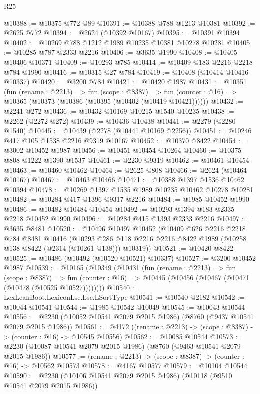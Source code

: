 \begin{lexlean}{R25}
\begin{coremodule}
@10388 := @10375 @772 @89
@10391 := @10388 @788 @1213 @10381
@10392 := @2625 @772
@10394 := @2624 (@10392 @10167)
@10395 := @10391 @10394
@10402 := @10269 @788 @1212 @1989 @10235 @10381 @10278 @10281
@10405 := @10285 @787 @2333 @2216
@10406 := @3635 @1990
@10408 := @10405 @10406 @10371
@10409 := @10293 @785
@10414 := @10409 @183 @2216 @2218 @784 @1990
@10416 := @10315 @27 @784
@10419 := @10408 (@10414 @10416 @10337)
@10420 := @3200 @784
@10421 := @10420 @1987
@10431 := @10351
    (fun (rename : @2213) =>
    fun (scope : @8387) =>
    fun (counter : @16) => @10365 (@10373 (@10386 (@10395 (@10402 (@10419 @10421))))))
@10432 := @2241 @272
@10436 := @10432 @10169 @10215 @1540 @10235
@10438 := @2262 (@2272 @272)
@10439 := @10436 @10438
@10441 := @2279 (@2280 @1540)
@10445 := @10439 (@2278 (@10441 @10169 @2256))
@10451 := @10246 @417 @105 @1538 @2216 @9319 @10167
@10452 := @10370 @8422
@10454 := @3002 @10452 @1987
@10456 := @10451 @10454 @10264
@10460 := @10375 @808 @1222 @1390 @1537
@10461 := @2230 @9319
@10462 := @10461 @10454
@10463 := @10460 @10462
@10464 := @2625 @808
@10466 := @2624 (@10464 @10167)
@10467 := @10463 @10466
@10471 := @10388 @1397 @1536 @10462 @10394
@10478 := @10269 @1397 @1535 @1989 @10235 @10462 @10278 @10281
@10482 := @10284 @417 @1396 @9317 @2216
@10484 := @1985 @10452 @1990
@10486 := @10482 @10484 @10454
@10492 := @10293 @1394 @183 @2335 @2218 @10452 @1990
@10496 := @10284 @415 @1393 @2333 @2216
@10497 := @3635 @8481
@10520 := @10496
    @10497
    @10452
    (@10409
      @626
      @2216
      @2218
      @784
      @8481
      @10416
      (@10293 @286 @118 @2216 @2216 @8422 @1989 (@10258 @138 @8422 (@2314 (@10261 @138))) @10319))
@10521 := @10420 @8422
@10525 := @10486 (@10492 (@10520 @10521) @10337)
@10527 := @3200 @10452 @1987
@10539 := @10165
    (@10349
      (@10431
        (fun (rename : @2213) =>
        fun (scope : @8387) =>
        fun (counter : @16) => @10445 (@10456 (@10467 (@10471 (@10478 (@10525 @10527))))))))
@10540 := LexLeanBoot.LexiconLse.Lse.LSortType
@10541 := @10540 @2182
@10542 := @10044 @10541
@10544 := @1985 @10542 @10049
@10545 := @10043 @10544
@10556 := @2230 (@10052 @10541 @2079 @2015 @1986) (@8760 (@9437 @10541 @2079 @2015 @1986))
@10561 := @4172 ((rename : @2213) -> (scope : @8387) -> (counter : @16) -> @10545 @10556)
@10562 := @10085 @10544
@10573 := @2230 (@10087 @10541 @2079 @2015 @1986) (@8760 (@9463 @10541 @2079 @2015 @1986))
@10577 := (rename : @2213) -> (scope : @8387) -> (counter : @16) -> @10562 @10573
@10578 := @4167 @10577
@10579 := @10104 @10544
@10590 := @2230 (@10106 @10541 @2079 @2015 @1986) (@10118 (@9510 @10541 @2079 @2015 @1986))

\end{coremodule}
\end{lexlean}
